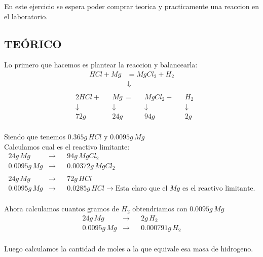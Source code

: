 \documentclass[12pt]{report}
\begin{document}
En este ejercicio se espera poder comprar teorica y practicamente una reaccion en el laboratorio.\\

\subsection{TEÓRICO}

Lo primero que hacemos es plantear la reaccion y balancearla:\\
$$
\begin{aligned}
    HCl + Mg &= MgCl_2 + H_2\\[6pt]
    &\Downarrow\\[6pt]
\end{aligned}
$$
$$
\begin{aligned}
    &2HCl + &&Mg \, = &&MgCl_2 + &&H_2 \\[6pt]
    &\downarrow &&\downarrow &&\downarrow &&\downarrow \\
    &72g &&24g &&94g &&2g \\[12pt]
\end{aligned}
$$

Siendo que tenemos $0.365g \, HCl$ y $0.0095g \, Mg$\\

Calculamos cual es el reactivo limitante:\\

$$
\begin{aligned}
    24g \, Mg &\rightarrow&& 94g \, MgCl_2 \\[6pt]
    0.0095g \, Mg &\rightarrow&& 0.00372g \, MgCl_2\\[6pt]
    \\
    24g \, Mg &\rightarrow&& 72g \, HCl \\[6pt]
    0.0095g \, Mg &\rightarrow&& 0.0285g \, HCl \rightarrow \text{Esta claro que el $Mg$ es el reactivo limitante.}\\[6pt]
\end{aligned}
$$

Ahora calculamos cuantos gramos de $H_2$ obtendriamos con $0.0095g \, Mg$ \\

$$
\begin{aligned}
    24g \, Mg &\rightarrow&& 2g \, H_2 \\[6pt]
    0.0095g \, Mg &\rightarrow&& 0.000791g \, H_2\\[6pt]
\end{aligned}
$$

Luego calculamos la cantidad de moles a la que equivale esa masa de hidrogeno.\\
\end{document}
